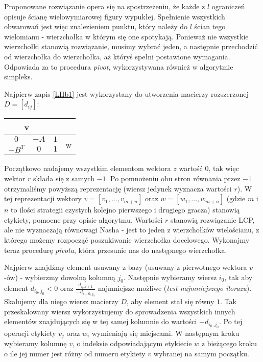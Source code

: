 \documentclass[polish]{standalone}
\begin{document}
Proponowane rozwiązanie opera się na spostrzeżeniu, że każde z $l$ ograniczeń opisuje ścianę wielowymiarowej figury
wypukłej. Spełnienie wszystkich obwarowań jest więc znalezieniem punktu, który należy do $l$ ścian tego wielomianu -
wierzchołka w którym się one spotykają. Ponieważ nie wszystkie wierzchołki stanowią rozwiązanie, musimy wybrać jeden, a
następnie przechodzić od wierzchołka do wierzchołka, aż któryś spełni postawione wymagania. Odpowiada za to procedura
\textit{pivot}, wykorzystywana również w algorytmie simpleks.

Najpierw zapis \ref{LHb1} jest wykorzystany do utworzenia macierzy rozszerzonej $D = [d_{ij}]$:
\begin{center}
\begin{tabular}[t]{ | c                       c      | c    | c                  }
                      \multicolumn{2}{|c|}{v}        &      &                    \\
\hline
                      $0$                     & $-A$ &  $1$ & \multirow{2}{*}{w} \\
                      $-B^T$                  & $0$  &  $1$ &                    \\
\hline
\end{tabular}
\end{center}
Początkowo nadajemy wszystkim elementom wektora $z$ wartość $0$, tak więc wektor $r$ składa się z samych $-1$. Po
pomnożeniu obu stron równania przez $-1$ otrzymaliśmy powyższą reprezentację (wiersz jedynek wyznacza wartości $r$).
W tej reprezentacji wektory $v = [ v_1, ..., v_{m+n} ]$ oraz $w = [ w_1, ..., w_{m+n} ]$ (gdzie $m$ i $n$ to ilości
strategii czystych kolejno pierwszego i drugiego gracza) stanowią etykiety, pomocne przy opisie algorytmu. Wartości $r$
stanowią rozwiązanie LCP, ale nie wyznaczają równowagi Nasha - jest to jeden z wierzchołków wielościanu, z którego
możemy rozpocząć poszukiwanie wierzchołka docelowego. Wykonajmy teraz procedurę \textit{pivota}, która przesunie nas
do następnego wierzchołka.

Najpierw znajdźmy element usuwany z bazy (usuwany z pierwotnego wektora $v$-ów) - wybierzmy dowolną kolumną $j_0$.
Następnie wybieramy wiersz $i_0$, tak aby element $d_{i_0,j_0} < 0$ oraz $\frac{d_{i_0,l+1}}{-d_{i+0,j_0}}$ najmniejsze
możliwe (\textit{test najmniejszego ilorazu}). Skalujemy dla niego wiersz macierzy $D$, aby element stał się równy $1$.
Tak przeskalowany wiersz wykorzystujemy do sprowadzenia wszystkich innych elementów znajdujących się w tej samej
kolumnie do wartości $-d_{i_0,j_0}$. Po tej operacji etykiety $v_j$ oraz $w_i$ wymieniają się miejscami. W następnym
kroku wybieramy kolumnę $v$, o indeksie odpowiadającym etykiecie $w$ z bieżącego kroku o ile jej numer jest różny od
numeru etykiety $v$ wybranej na samym początku.
\end{document}
